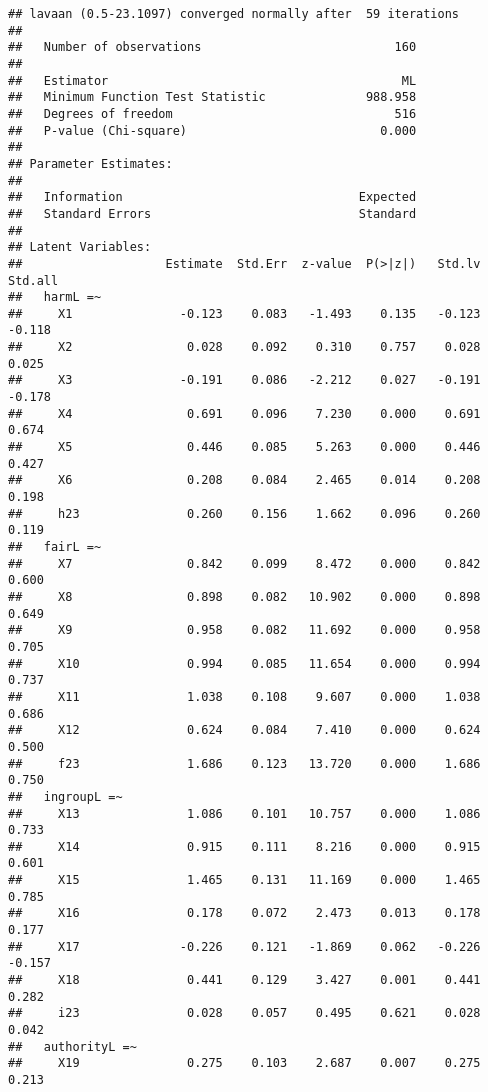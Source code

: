 \documentclass[english,man]{apa6}
\newcounter{author}
\theoremstyle{definition}
\theoremstyle{definition}
\theoremstyle{definition}
\theoremstyle{remark}
\begin{document}
\begin{verbatim}
## lavaan (0.5-23.1097) converged normally after  59 iterations
## 
##   Number of observations                           160
## 
##   Estimator                                         ML
##   Minimum Function Test Statistic              988.958
##   Degrees of freedom                               516
##   P-value (Chi-square)                           0.000
## 
## Parameter Estimates:
## 
##   Information                                 Expected
##   Standard Errors                             Standard
## 
## Latent Variables:
##                    Estimate  Std.Err  z-value  P(>|z|)   Std.lv  Std.all
##   harmL =~                                                              
##     X1               -0.123    0.083   -1.493    0.135   -0.123   -0.118
##     X2                0.028    0.092    0.310    0.757    0.028    0.025
##     X3               -0.191    0.086   -2.212    0.027   -0.191   -0.178
##     X4                0.691    0.096    7.230    0.000    0.691    0.674
##     X5                0.446    0.085    5.263    0.000    0.446    0.427
##     X6                0.208    0.084    2.465    0.014    0.208    0.198
##     h23               0.260    0.156    1.662    0.096    0.260    0.119
##   fairL =~                                                              
##     X7                0.842    0.099    8.472    0.000    0.842    0.600
##     X8                0.898    0.082   10.902    0.000    0.898    0.649
##     X9                0.958    0.082   11.692    0.000    0.958    0.705
##     X10               0.994    0.085   11.654    0.000    0.994    0.737
##     X11               1.038    0.108    9.607    0.000    1.038    0.686
##     X12               0.624    0.084    7.410    0.000    0.624    0.500
##     f23               1.686    0.123   13.720    0.000    1.686    0.750
##   ingroupL =~                                                           
##     X13               1.086    0.101   10.757    0.000    1.086    0.733
##     X14               0.915    0.111    8.216    0.000    0.915    0.601
##     X15               1.465    0.131   11.169    0.000    1.465    0.785
##     X16               0.178    0.072    2.473    0.013    0.178    0.177
##     X17              -0.226    0.121   -1.869    0.062   -0.226   -0.157
##     X18               0.441    0.129    3.427    0.001    0.441    0.282
##     i23               0.028    0.057    0.495    0.621    0.028    0.042
##   authorityL =~                                                         
##     X19               0.275    0.103    2.687    0.007    0.275    0.213

\end{verbatim}
\end{document}

